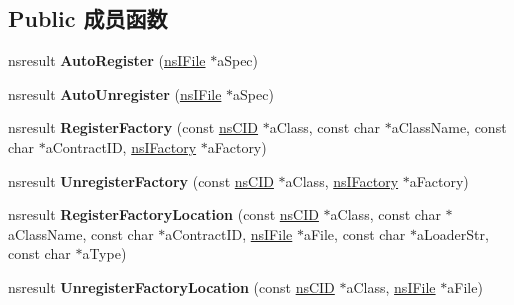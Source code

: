\subsection*{Public 成员函数}
\begin{DoxyCompactItemize}
\item 
\mbox{\label{interfacens_i_component_registrar_a58026c1912935600d1465732d568fec2}} 
nsresult {\bfseries Auto\+Register} (\hyperlink{interfacens_i_file}{ns\+I\+File} $\ast$a\+Spec)
\item 
\mbox{\label{interfacens_i_component_registrar_a409f4514429d4b5e39567df8f455d84d}} 
nsresult {\bfseries Auto\+Unregister} (\hyperlink{interfacens_i_file}{ns\+I\+File} $\ast$a\+Spec)
\item 
\mbox{\label{interfacens_i_component_registrar_ac3d33c5ffcf410ceda3f06ac7e2bdf0a}} 
nsresult {\bfseries Register\+Factory} (const \hyperlink{struct___i_i_d}{ns\+C\+ID} $\ast$a\+Class, const char $\ast$a\+Class\+Name, const char $\ast$a\+Contract\+ID, \hyperlink{interfacens_i_factory}{ns\+I\+Factory} $\ast$a\+Factory)
\item 
\mbox{\label{interfacens_i_component_registrar_ab92118bfc4599eb39d8d4d085f096051}} 
nsresult {\bfseries Unregister\+Factory} (const \hyperlink{struct___i_i_d}{ns\+C\+ID} $\ast$a\+Class, \hyperlink{interfacens_i_factory}{ns\+I\+Factory} $\ast$a\+Factory)
\item 
\mbox{\label{interfacens_i_component_registrar_acc45f4f696c18ecaaeeea7079d80a1a6}} 
nsresult {\bfseries Register\+Factory\+Location} (const \hyperlink{struct___i_i_d}{ns\+C\+ID} $\ast$a\+Class, const char $\ast$a\+Class\+Name, const char $\ast$a\+Contract\+ID, \hyperlink{interfacens_i_file}{ns\+I\+File} $\ast$a\+File, const char $\ast$a\+Loader\+Str, const char $\ast$a\+Type)
\item 
\mbox{\label{interfacens_i_component_registrar_a82d79d49286d158bba6d5ec1eb8e994e}} 
nsresult {\bfseries Unregister\+Factory\+Location} (const \hyperlink{struct___i_i_d}{ns\+C\+ID} $\ast$a\+Class, \hyperlink{interfacens_i_file}{ns\+I\+File} $\ast$a\+File)
\item 

\end{DoxyCompactItemize}
